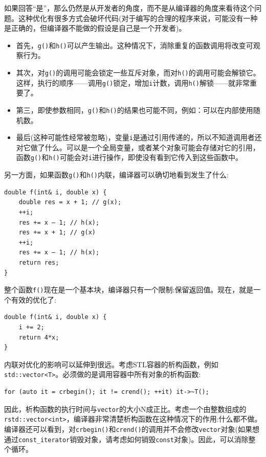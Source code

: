 如果回答“是”，那么仍然是从开发者的角度，而不是从编译器的角度来看待这个问题。这种优化有很多方式会破坏代码(对于编写的合理的程序来说，可能没有一种是正确的，但编译器不能做的假设是自己是一个开发者)。 

\begin{itemize}
\item
首先，\texttt{g()}和\texttt{h()}可以产生输出。这种情况下，消除重复的函数调用将改变可观察行为。 

\item
其次，对\texttt{g()}的调用可能会锁定一些互斥对象，而对\texttt{h()}的调用可能会解锁它。这样，执行的顺序——调用\texttt{g()}锁定，增加\texttt{i}计数，调用\texttt{h()}解锁——就非常重要了。 

\item
第三，即使参数相同，\texttt{g()}和\texttt{h()}的结果也可能不同，例如：可以在内部使用随机数。 

\item
最后(这种可能性经常被忽略)，变量\texttt{i}是通过引用传递的，所以不知道调用者还对它做了什么。可以是一个全局变量，或者某个对象可能会存储对它的引用，函数\texttt{g()}和\texttt{h()}可能会对\texttt{i}进行操作，即使没有看到它传入到这些函数中。 
	
\end{itemize}

另一方面，如果函数\texttt{g()}和\texttt{h()}内联，编译器可以确切地看到发生了什么:

\begin{lstlisting}[style=styleCXX]
double f(int& i, double x) {
	double res = x + 1; // g(x);
	++i;
	res += x – 1; // h(x);
	res += x + 1; // g(x)
	++i;
	res += x – 1; // h(x);
	return res;
}
\end{lstlisting}

整个函数\texttt{f()}现在是一个基本块，编译器只有一个限制:保留返回值。现在，就是一个有效的优化了:

\begin{lstlisting}[style=styleCXX]
double f(int& i, double x) {
	i += 2;
	return 4*x;
}
\end{lstlisting}

内联对优化的影响可以延伸到很远。考虑STL容器的析构函数，例如\texttt{std::vector<T>}。必须做的是调用容器中所有对象的析构函数:

\begin{lstlisting}[style=styleCXX]
for (auto it = crbegin(); it != crend(); ++it) it->~T();
\end{lstlisting}

因此，析构函数的执行时间与\texttt{vector}的大小N成正比。考虑一个由整数组成的\texttt{rstd::vector<int>}，编译器非常清楚析构函数在这种情况下的作用:什么都不做。编译器还可以看到，对\texttt{crbegin()}和\texttt{crend()}的调用并不会修改\texttt{vector}对象(如果想通过\texttt{const\_iterator}销毁对象，请考虑如何销毁\texttt{const}对象)。因此，可以消除整个循环。

